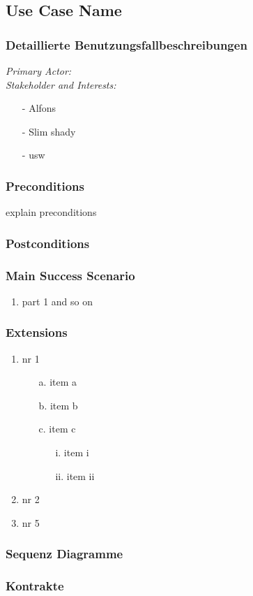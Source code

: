\documentclass[./detailed_overview_usecases.tex]{subfiles}
\begin{document}
    \subsection{Use Case Name}
    \subsubsection{Detaillierte Benutzungsfallbeschreibungen}

    \textit{Primary Actor:}
    \\
    \textit{Stakeholder and Interests:}
    \begin{itemize}
        \item[-] Alfons
        \item[-] Slim shady
        \item[-] usw
    \end{itemize}

    \subsubsection*{Preconditions}
    explain preconditions

    \subsubsection*{Postconditions}

    \subsubsection*{Main Success Scenario}
    \begin{enumerate}
        \item part 1 and so on
    \end{enumerate}

    \subsubsection*{Extensions}
    \begin{enumerate}
        \item nr 1 \begin{itemize}
                       \item[a.] item a
                       \item[b.] item b
                       \item[c.] item c
                                \begin{itemize}
                                     \item[i.] item i
                                     \item[ii.] item ii
                                \end{itemize}
                    \end{itemize}
        \item nr 2
        \setcounter{enumi}{4}
        \item nr 5
    \end{enumerate}

    \subsubsection{Sequenz Diagramme}
    \subsubsection{Kontrakte}
\end{document}
